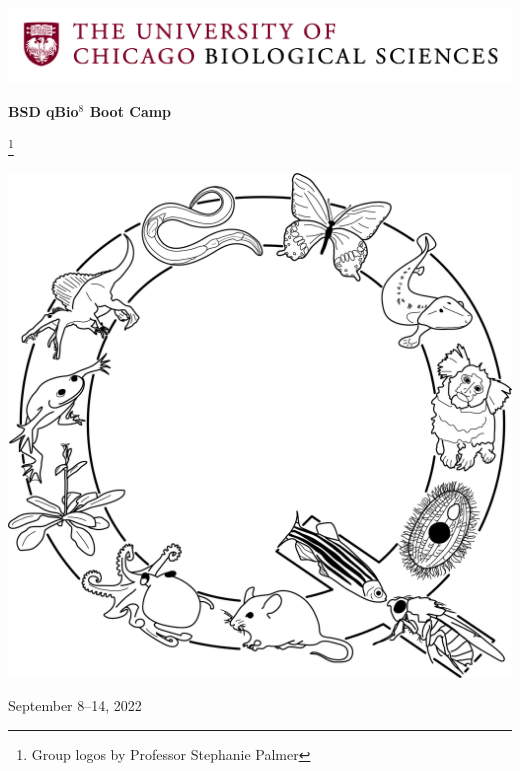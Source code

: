 \documentclass{article}
\newcommand\blfootnote[1]{%
  \begingroup
  \renewcommand\thefootnote{}\footnote{#1}%
  \addtocounter{footnote}{-1}%
  \endgroup
}
\begin{document}
\begin{centering}
\includegraphics[width=\linewidth]{BSDLogo.jpg}

\vspace{0.11in}

\Huge{\textbf{BSD qBio$^8$ Boot Camp}}

\blfootnote{Group logos by Professor Stephanie Palmer}

\vspace{0.1in}

\includegraphics[width=0.95\linewidth]{../../logo_group/Q.png}


\vspace{0.2in}

\Large{September 8--14, 2022}\\

\end{centering}
\end{document}
